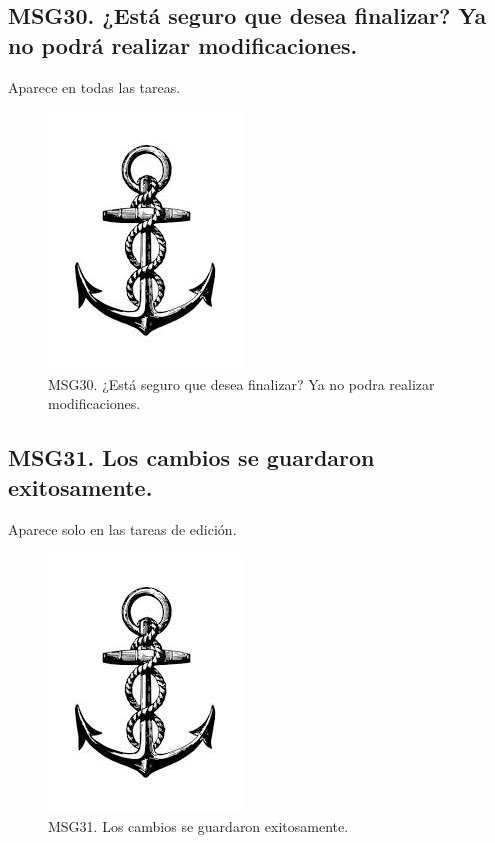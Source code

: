     \subsection{MSG30. ¿Está seguro que desea finalizar? Ya no podrá realizar modificaciones.}
    Aparece en todas las tareas.
        \begin{figure}[htbp]
            \begin{center}
                \includegraphics[width=.4\textwidth]{images/MSG/ancla}
                \caption{MSG30. ¿Está seguro que desea finalizar? Ya no podra realizar modificaciones.}
                \label{fig:MSG30}
            \end{center}
        \end{figure}

    \subsection{MSG31. Los cambios se guardaron exitosamente.}
    Aparece solo en las tareas de edición.
        \begin{figure}[htbp]
            \begin{center}
                \includegraphics[width=.4\textwidth]{images/MSG/ancla}
                \caption{MSG31. Los cambios se guardaron exitosamente.}
                \label{fig:MSG31}
            \end{center}
        \end{figure}

